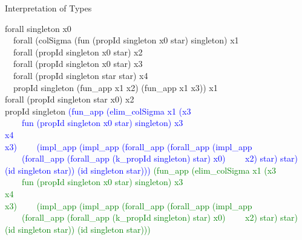 \documentclass{beamer}
\newcommand{\cblue}[1]{\textcolor{blue}{#1}}
\newcommand{\cgreen}[1]{\textcolor{green}{#1}}
\begin{document}
\begin{frame}[fragile]{Interpretation of Types}{}{}{}{\small
	\begin{semiverbatim}
		forall singleton x0 \\ 
		\ \ forall \alert{(colSigma ({fun (propId singleton x0 star) singleton}) x1 \\
		\ \ forall (propId singleton x0 star) x2 \\ 
		\ \ forall (propId singleton x0 star) x3 \\ 
		\ \ forall (propId singleton star star) x4 \\ 
		\ \ propId singleton (fun_app x1 x2) (fun_app x1 x3))} x1 \\
		forall (propId singleton star x0) x2 \\ propId singleton
		\cblue{(fun_app (elim_colSigma x1 (x3 \\ 
		\ \ \ \ fun (propId singleton x0 star) singleton) x3 \\ x4 \\ x3)
		\ \ \ \ (impl_app (impl_app (forall_app (forall_app (impl_app 
		\ \ \ \ (forall_app (forall_app (k_propId singleton) star) x0) 
		\ \ \ \ x2) star) star) (id singleton star)) (id singleton star)))}
		\cgreen{(fun_app (elim_colSigma x1 (x3 \\ 
		\ \ \ \ fun (propId singleton x0 star) singleton) x3 \\ x4 \\ x3)
		\ \ \ \ (impl_app (impl_app (forall_app (forall_app (impl_app 
		\ \ \ \ (forall_app (forall_app (k_propId singleton) star) x0) 
		\ \ \ \ x2) star) star) (id singleton star)) (id singleton star)))}		
	\end{semiverbatim}
}
\end{frame}
\end{document}
